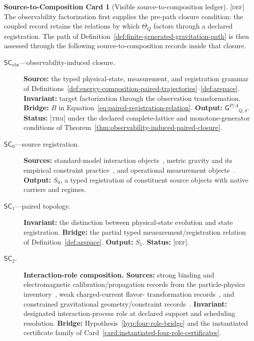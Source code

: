 \documentclass[11pt]{article}
\newcommand{\GPair}{\ensuremath{\mathsf{G}^{P/A}}}
\newcommand{\Defn}{\textsc{[def]}}
\newcommand{\Thm}{\textsc{[thm]}}
\theoremstyle{definition}
\newtheorem{compositioncard}{Source-to-Composition Card}
\begin{document}
\begin{compositioncard}[Visible source-to-composition ledger]
\label{card:visible-source-ledger}
\Defn{} The observability factorization first supplies the pre-path closure
condition: the coupled record retains the relations by which $\Theta_Q$ factors
through a declared registration. The path of
Definition~\ref{def:finite-generated-gravitation-path} is then assessed through the
following source-to-composition records inside that closure.
\begin{description}
\item[$\mathsf{SC}_{\mathrm{obs}}$---observability-induced closure.] \textbf{Source:}
the typed physical-state, measurement, and registration grammar of
Definitions~\ref{def:energy-composition-paired-trajectories}--\ref{def:arspace}.
\textbf{Invariant:} target factorization through the observation transformation.
\textbf{Bridge:} $B$ in Equation~\eqref{eq:paired-registration-relation}.
\textbf{Output:} $\GPair_{Q,\delta}$. \textbf{Status:} \Thm{} under the declared
complete-lattice and monotone-generator conditions of
Theorem~\ref{thm:observability-induced-paired-closure}.
\item[$\mathsf{SC}_0$---source registration.] \textbf{Sources:} standard-model
interaction objects~\cite{S_PDG2024}, metric gravity and its empirical constraint
practice~\cite{S_Einstein1916,S_Will2014,S_Berti2015}, and operational measurement
objects~\cite{S_DaviesLewis1970,S_Ozawa1984}. \textbf{Output:} $S_0$, a typed
registration of constituent source objects with native carriers and regimes.
\item[$\mathsf{SC}_1$---paired topology.] \textbf{Invariant:} the distinction
between physical-state evolution and state registration. \textbf{Bridge:} the
partial typed measurement/registration relation of
Definition~\ref{def:arspace}. \textbf{Output:} $S_1$. \textbf{Status:} \Defn{}.
\item[$\mathsf{SC}_2$.] \textbf{Interaction-role composition. Sources:}
strong binding and electromagnetic calibration/propagation records from the
particle-physics inventory~\cite{S_PDG2024}, weak charged-current flavor-
transformation records~\cite{S_MakiNakagawaSakata1962,S_Wolfenstein1978}, and
constrained gravitational geometry/constraint records~\cite{S_ArnowittDeserMisner1962}.
\textbf{Invariant:} designated interaction-process role at declared support and
scheduling resolution. \textbf{Bridge:} Hypothesis~\ref{hyp:four-role-bridge} and
the instantiated certificate family of Card~\ref{card:instantiated-four-role-certificates}.

\end{description}
\end{compositioncard}
\end{document}
